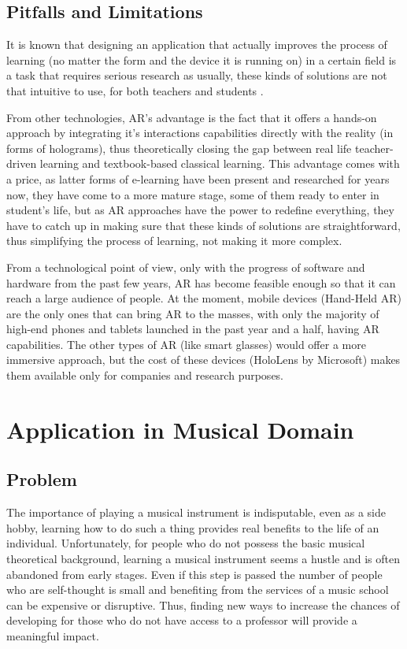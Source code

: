 \documentclass[12 pct]{report}
\begin{document}
\section{Pitfalls and Limitations}
It is known that designing an application that actually improves the process of learning (no matter the form and the device it is running on) in a certain field is a task that requires serious research as usually, these kinds of solutions are not that intuitive to use, for both teachers and students \cite{wu2013current} . 

From other technologies, AR's advantage is the fact that it offers a hands-on approach by integrating it's interactions capabilities directly \cite{akccayir2017advantages} with the reality (in forms of holograms), thus theoretically closing the gap between real life teacher-driven learning and textbook-based classical learning. This advantage comes with a price, as latter forms of e-learning have been present and researched for years now, they have come to a more mature stage, some of them ready to enter in student's life, but as AR approaches have the power to redefine everything, they have to catch up in making sure that these kinds of solutions are straightforward, thus simplifying the process of learning, not making it more complex.

From a technological point of view, only with the progress of software and hardware from the past few years, AR has become feasible enough so that it can reach a large audience of people. At the moment, mobile devices (Hand-Held AR) are the only ones that can bring AR to the masses, with only the majority of high-end phones and tablets launched in the past year and a half, having AR capabilities. The other types of AR (like smart glasses) would offer a more immersive approach, but the cost of these devices (HoloLens \cite{kress201711} by Microsoft) makes them available only for companies and research purposes.
\chapter{Application in Musical Domain}

\section{Problem}
The importance of playing a musical instrument is indisputable, even as a side hobby, learning how to do such a thing provides real benefits to the life of an individual. Unfortunately, for people who do not possess the basic musical theoretical background, learning a musical instrument seems a hustle and is often abandoned from early stages. Even if this step is passed the number of people who are self-thought is small and benefiting from the services of a music school can be expensive or disruptive. Thus, finding new ways to increase the chances of developing for those who do not have access to a professor will provide a meaningful impact.
\end{document}
